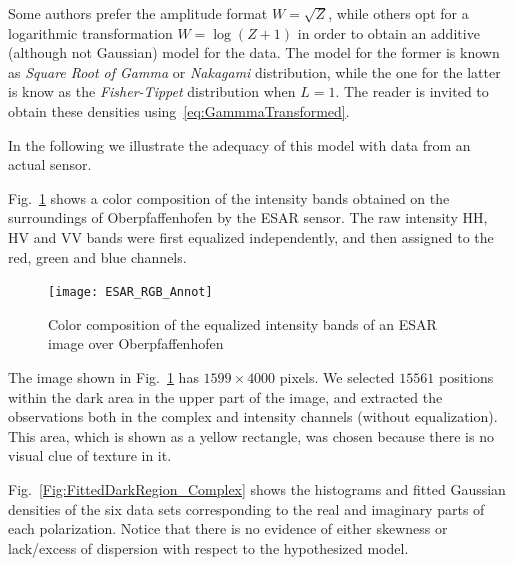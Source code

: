 \documentclass{beamer}
\begin{document}
\begin{frame}[allowframebreaks]
Some authors prefer the amplitude format $W=\sqrt{Z}$, while others opt for a logarithmic transformation $W=\log(Z+1)$ in order to obtain an additive (although not Gaussian) model for the data.
The model for the former is known as \textit{Square Root of Gamma} or \textit{Nakagami} distribution,
while the one for the latter is know as the \textit{Fisher-Tippet} distribution when $L=1$.
The reader is invited to obtain these densities using~\eqref{eq:GammmaTransformed}.

In the following we illustrate the adequacy of this model with data from an actual sensor.

Fig.~\ref{Im:Oberpfaffenhofen_RGB} shows a color composition of the intensity bands obtained on the surroundings of Oberpfaffenhofen by the ESAR sensor.
The raw intensity HH, HV and VV bands were first equalized independently, and then assigned to the red, green and blue channels.

\begin{figure}
\centering
\texttt{[image: ESAR\_RGB\_Annot]}
\caption{Color composition of the equalized intensity bands of an ESAR image over Oberpfaffenhofen}\label{Im:Oberpfaffenhofen_RGB}
\end{figure}

The image shown in Fig.~\ref{Im:Oberpfaffenhofen_RGB} has $1599\times4000$ pixels.
We selected $15561$ positions within the dark area in the upper part of the image, and extracted the observations both in the complex and intensity channels (without equalization).
This area, which is shown as a yellow rectangle, was chosen because there is no visual clue of texture in it.

Fig.~\ref{Fig:FittedDarkRegion_Complex} shows the histograms and fitted Gaussian densities of the six data sets corresponding to the real and imaginary parts of each polarization.
Notice that there is no evidence of either skewness or lack/excess of dispersion with respect to the hypothesized model.


\end{frame}
\end{document}
